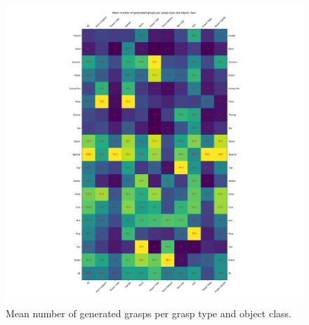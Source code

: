 \begin{figure}
\centering
\includegraphics[width=0.8\columnwidth]{images/post-analysis/mean_number_of_generated_grasps_per_grasp_type_and_object_class.png}
\caption{Mean number of generated grasps per grasp type and object class.}
\label{fig:post13}
\end{figure}




